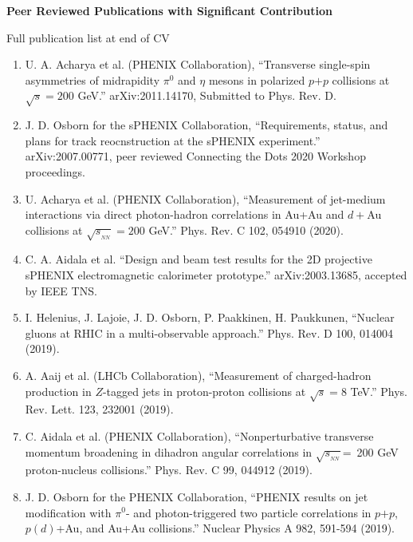 \documentclass[11pt]{article}
\begin{document}
\begin{flushleft}
\Large\textbf{Peer Reviewed Publications with Significant Contribution}
\vspace{4pt}

\small 
Full publication list at end of CV
\begin{center}
\normalsize
\begin{enumerate}
	\item U. A. Acharya et al. (PHENIX Collaboration), ``Transverse single-spin asymmetries of midrapidity $\pi^0$ and $\eta$ mesons in polarized $p$$+$$p$ collisions at $\sqrt{s}=200$ GeV.'' arXiv:2011.14170, Submitted to Phys. Rev. D.
	
	\item J. D. Osborn for the sPHENIX Collaboration, ``Requirements, status, and plans for track reocnstruction at the sPHENIX experiment.'' arXiv:2007.00771, peer reviewed Connecting the Dots 2020 Workshop proceedings.
	
	\item U. Acharya et al. (PHENIX Collaboration), ``Measurement of jet-medium interactions via direct photon-hadron correlations in Au+Au and $d+$Au collisions at $\sqrt{s_{_{NN}}}=200$ GeV.'' Phys. Rev. C 102, 054910 (2020).
	
	\item C. A. Aidala et al. ``Design and beam test results for the 2D projective sPHENIX electromagnetic calorimeter prototype.'' arXiv:2003.13685, accepted by IEEE TNS.
	
	\item I. Helenius, J. Lajoie, J. D. Osborn, P. Paakkinen, H. Paukkunen, ``Nuclear gluons at RHIC in a multi-observable approach.'' Phys. Rev. D 100, 014004 (2019).
	
	\item A. Aaij et al. (LHCb Collaboration), ``Measurement of charged-hadron production in $Z$-tagged jets in proton-proton collisions at $\sqrt{s}=8$ TeV.'' Phys. Rev. Lett. 123, 232001 (2019).
	
	\item C. Aidala et al. (PHENIX Collaboration), ``Nonperturbative transverse momentum broadening in dihadron angular correlations in $\sqrt{s_{_{NN}}}$=~200 GeV proton-nucleus collisions.''  Phys. Rev. C 99, 044912 (2019).

	\item J. D. Osborn for the PHENIX Collaboration, ``PHENIX results on jet modification with $\pi^0$- and photon-triggered two particle correlations in $p$$+$$p$, $p(d)$+Au, and Au+Au collisions.'' Nuclear Physics A 982, 591-594 (2019).


\end{enumerate}
\end{center}
\end{flushleft}
\end{document}
